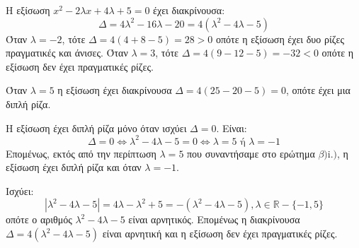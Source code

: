 
\begin{alist}
\item Η εξίσωση $x^2 - 2\lambda x + 4\lambda + 5 = 0$ έχει διακρίνουσα:
\[\Delta = 4\lambda^2 - 16\lambda - 20 = 4(\lambda^2 - 4\lambda - 5)\]
Όταν $\lambda = -2$, τότε
$\Delta = 4(4 + 8 - 5) = 28 > 0$
οπότε η εξίσωση έχει δυο ρίζες πραγματικές και άνισες.
Όταν $\lambda = 3$, τότε
$\Delta = 4(9 - 12 - 5) = -32 < 0$
οπότε η εξίσωση δεν έχει πραγματικές ρίζες.

\item
\begin{rlist}
\item Όταν $\lambda = 5$ η εξίσωση έχει διακρίνουσα $\Delta = 4(25 - 20 - 5) = 0$, οπότε έχει μια διπλή ρίζα.

\item Η εξίσωση έχει διπλή ρίζα μόνο όταν ισχύει $\Delta = 0$. Είναι:
\[\Delta = 0 \Leftrightarrow \lambda^2 - 4\lambda - 5 = 0 \Leftrightarrow \lambda = 5 \text{ ή } \lambda = -1\]
Επομένως, εκτός από την περίπτωση $\lambda = 5$ που συναντήσαμε στο ερώτημα $\beta) \text{i.})$, η εξίσωση έχει διπλή ρίζα και όταν $\lambda = -1$.
\end{rlist}

\item Ισχύει:
\[|\lambda^2 - 4\lambda - 5| = 4\lambda - \lambda^2 + 5 = -(\lambda^2 - 4\lambda - 5), \lambda \in \mathbb{R} - \{-1, 5\}\]
οπότε ο αριθμός $\lambda^2 - 4\lambda - 5$ είναι αρνητικός. Επομένως η διακρίνουσα $\Delta = 4(\lambda^2 - 4\lambda - 5)$ είναι αρνητική και η εξίσωση δεν έχει πραγματικές ρίζες.
\end{alist}

